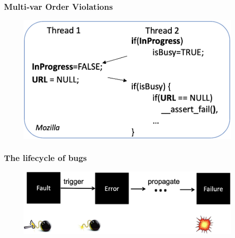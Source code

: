 % 
% 
\begin{frame}[fragile]
    \frametitle{Multi‐var Order Violations}
    \begin{figure}
    \includegraphics[width=0.4\linewidth]{figs/mutli-variable-ordering-violation.png}
    \end{figure}
\end{frame}
% 
% 
% 
% 
\begin{frame}[fragile]
    \frametitle{The lifecycle of bugs}
    \begin{figure}
    \includegraphics[width=0.4\linewidth]{figs/bug-lifecycle.png}
    \end{figure}
\end{frame}
% 
% 
% 
% 

